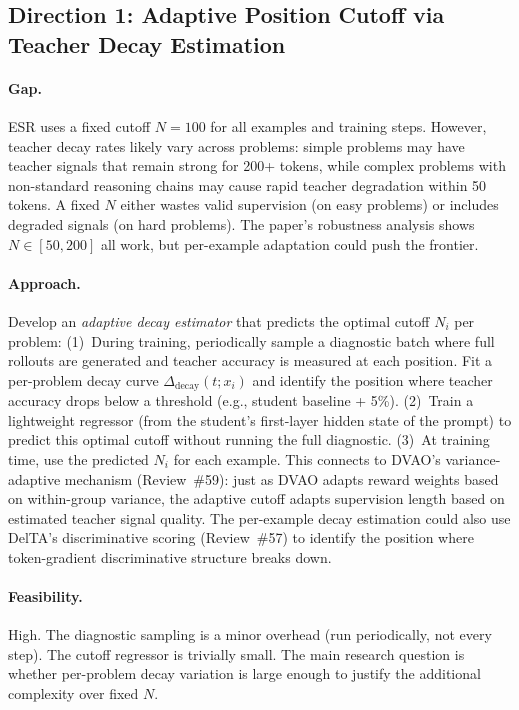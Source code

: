 \documentclass[11pt,a4paper]{article}
\begin{document}
\subsection*{Direction 1: Adaptive Position Cutoff via Teacher Decay Estimation}

\paragraph{Gap.}
ESR uses a fixed cutoff $N=100$ for all examples and training steps. However, teacher decay rates likely vary across problems: simple problems may have teacher signals that remain strong for 200+ tokens, while complex problems with non-standard reasoning chains may cause rapid teacher degradation within 50 tokens. A fixed $N$ either wastes valid supervision (on easy problems) or includes degraded signals (on hard problems). The paper's robustness analysis shows $N \in [50, 200]$ all work, but per-example adaptation could push the frontier.

\paragraph{Approach.}
Develop an \emph{adaptive decay estimator} that predicts the optimal cutoff $N_i$ per problem: (1)~During training, periodically sample a diagnostic batch where full rollouts are generated and teacher accuracy is measured at each position. Fit a per-problem decay curve $\Delta_{\mathrm{decay}}(t; x_i)$ and identify the position where teacher accuracy drops below a threshold (e.g., student baseline + 5\%). (2)~Train a lightweight regressor (from the student's first-layer hidden state of the prompt) to predict this optimal cutoff without running the full diagnostic. (3)~At training time, use the predicted $N_i$ for each example. This connects to DVAO's variance-adaptive mechanism (Review~\#59): just as DVAO adapts reward weights based on within-group variance, the adaptive cutoff adapts supervision length based on estimated teacher signal quality. The per-example decay estimation could also use DelTA's discriminative scoring (Review~\#57) to identify the position where token-gradient discriminative structure breaks down.

\paragraph{Feasibility.}
High. The diagnostic sampling is a minor overhead (run periodically, not every step). The cutoff regressor is trivially small. The main research question is whether per-problem decay variation is large enough to justify the additional complexity over fixed $N$.
\end{document}
